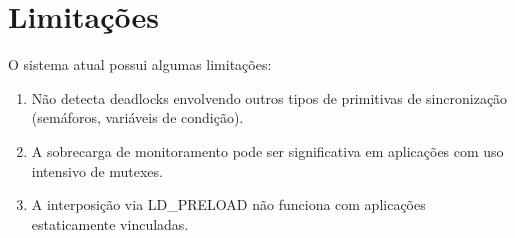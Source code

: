 \section{Limitações}

O sistema atual possui algumas limitações:

\begin{enumerate}
    \item Não detecta deadlocks envolvendo outros tipos de primitivas de sincronização (semáforos, variáveis de condição).
    \item A sobrecarga de monitoramento pode ser significativa em aplicações com uso intensivo de mutexes.
    \item A interposição via LD\_PRELOAD não funciona com aplicações estaticamente vinculadas.
\end{enumerate}
